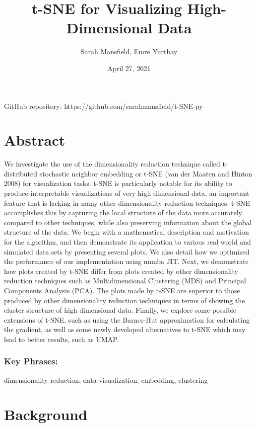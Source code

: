 \documentclass{article}
\title{t-SNE for Visualizing High-Dimensional Data}
\author{Sarah Mansfield, Emre Yurtbay }
\date{April 27, 2021}
\begin{document}
\maketitle

\begin{center}
GitHub repository: https://github.com/sarahmansfield/t-SNE-py
\end{center}

\section*{Abstract}

We investigate the use of the dimensionality reduction technique called t-distributed stochastic neighbor embedding or t-SNE (van der Maaten and Hinton 2008) for visualization tasks. t-SNE is particularly notable for its ability to produce interpretable visualizations of very high dimensional data, an important feature that is lacking in many other dimensionality reduction techniques. t-SNE accomplishes this by capturing the local structure of the data more accurately compared to other techniques, while also preserving information about the global structure of the data. We begin with a mathematical description and motivation for the algorithm, and then demonstrate its application to various real world and simulated data sets by presenting several plots. We also detail how we optimized the performance of our implementation using numba JIT. Next, we demonstrate how plots created by t-SNE differ from plots created by other dimensionality reduction techniques such as Multidimensional Clustering (MDS) and Principal Components Analysis (PCA). The plots made by t-SNE are superior to those produced by other dimensionality reduction techniques in terms of showing the cluster structure of high dimensional data. Finally, we explore some possible extensions of t-SNE, such as using the Barnes-Hut approximation for calculating the gradient, as well as some newly developed alternatives to t-SNE which may lead to better results, such as UMAP. 

\subsubsection*{Key Phrases:}
dimensionality reduction, data visualization, embedding, clustering

\section*{Background}
\end{document}
